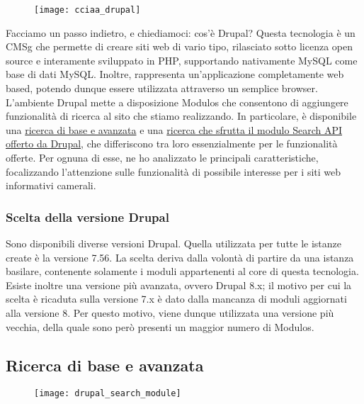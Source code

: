 		\label{img:cciaa_drupal}
		\begin{figure}[htbp]
			\begin{center}
				\texttt{[image: cciaa\_drupal]}
			\end{center}
		\end{figure}
	
		Facciamo un passo indietro, e chiediamoci: cos'è Drupal?
		Questa tecnologia è un \gls{CMSg} che permette di creare siti web di vario tipo, rilasciato sotto licenza \gls{open source} e interamente sviluppato in \gls{PHP}, supportando nativamente \gls{MySQL} come base di dati \gls{MySQL}. Inoltre, rappresenta un'applicazione completamente web based, potendo dunque essere utilizzata attraverso un semplice browser. \\		
		L'ambiente \gls{Drupal} mette a disposizione \glspl{Modulo} che consentono di aggiungere funzionalità di ricerca al sito che stiamo realizzando. In particolare, è disponibile una \hyperref[cap:drupalSearch]{ricerca di base e avanzata} e una \hyperref[cap:drupalSearchAPI]{ricerca che sfrutta il modulo Search API offerto da Drupal}, che differiscono tra loro essenzialmente per le funzionalità offerte. Per ognuna di esse, ne ho analizzato le principali caratteristiche, focalizzando l'attenzione sulle funzionalità di possibile interesse per i siti web informativi camerali.
		
			\subsubsection {Scelta della versione Drupal}
			Sono disponibili diverse versioni \gls{Drupal}. Quella utilizzata per tutte le istanze create è la versione 7.56. La scelta deriva dalla volontà di partire da una istanza basilare, contenente solamente i moduli appartenenti al core di questa tecnologia. Esiste inoltre una versione più avanzata, ovvero Drupal 8.x; il motivo per cui la scelta è ricaduta sulla versione 7.x è dato dalla mancanza di moduli aggiornati alla versione 8. Per questo motivo, viene dunque utilizzata una versione più vecchia, della quale sono però presenti un maggior numero di \glspl{Modulo}.
		
		\subsection{Ricerca di base e avanzata}

		\begin{figure}[htbp]
			\begin{center}
				\texttt{[image: drupal\_search\_module]}
			\end{center}
		\end{figure}
	
